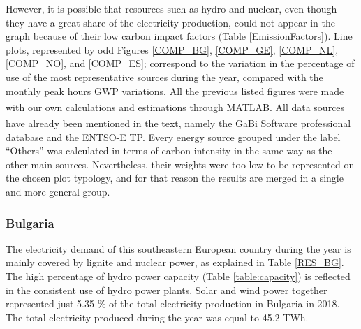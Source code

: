 {However, it is possible that resources such as hydro and nuclear, even though they have a great share of the electricity production,  could not appear in the graph because of their low carbon impact factors (Table \ref{EmissionFactors}). Line plots, represented by odd Figures \ref{COMP_BG}, \ref{COMP_GE}, \ref{COMP_NL}, \ref{COMP_NO}, and \ref{COMP_ES}; correspond to the variation in the percentage of use of the most representative sources during the year, compared with the monthly peak hours GWP variations. {All the previous listed figures were made with our own calculations and estimations through MATLAB\textsuperscript{\textregistered}. All data sources have already been mentioned in the text, namely the  GaBi\textsuperscript{\textregistered} Software professional database and the ENTSO-E TP.} {Every energy source grouped under the label ``Others'' was calculated in terms of carbon intensity in the same way as the other main sources. Nevertheless, their weights were too low to be represented on the chosen plot typology, and for that reason the results are merged in a single and more general group}.\\





\subsubsection{Bulgaria}
The electricity demand of this southeastern European country  during the year is mainly covered by lignite and nuclear power, as explained in Table \ref{RES_BG}. The high percentage of hydro power capacity (Table \ref{table:capacity}) is reflected in the  consistent use of hydro power plants. Solar and wind power together represented  just 5.35 \% of the total electricity production in Bulgaria in 2018. The total electricity produced during the year was equal to 45.2 TWh. 
 
 
 \begin{table}[htbp]
\centering
\caption{Percentage of resources used during peak and off-peak hours in Bulgaria  \cite{Entso-eProduction}.}
\label{RES_BG}
\end{table}
 
}
